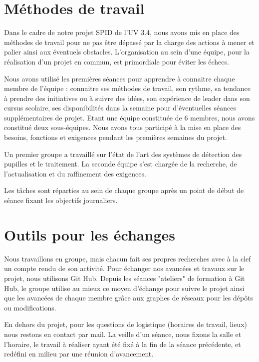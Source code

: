 
\chapter{Méthodes de travail}

Dans le cadre de notre projet SPID de l’UV 3.4, nous avons mis en place des méthodes de travail pour ne pas être dépassé par la charge des actions à mener et palier ainsi aux éventuels obstacles.  
L’organisation au sein d’une équipe, pour la réalisation d’un projet en commun, est primordiale pour éviter les échecs.

Nous avons utilisé les premières séances pour apprendre à connaitre chaque membre de l’équipe : connaitre ses méthodes de travail, son rythme, sa tendance à prendre des initiatives ou à suivre des idées, son expérience de leader dans son cursus scolaire, ses disponibilités dans la semaine pour d’éventuelles séances supplémentaires de projet. 
Etant une équipe constituée de 6 membres, nous avons constitué deux sous-équipes. Nous avons tous participé à la mise en place des besoins, fonctions et exigences pendant les premières semaines du projet. 

Un premier groupe a travaillé sur l'état de l'art des systèmes de détection des pupilles et le traitement. La seconde équipe s'est chargée de la recherche, de l'actualisation et du raffinement  des exigences. 

Les tâches sont réparties au sein de chaque groupe après un point de début de séance fixant les objectifs journaliers.

\chapter{Outils pour les échanges}

Nous travaillons en groupe, mais chacun fait ses propres recherches avec à la clef un compte rendu de son activité. Pour échanger nos avancées et travaux sur le projet, nous utilisons Git Hub. Depuis les séances "ateliers" de formation à Git Hub, le groupe utilise au mieux ce moyen d'échange pour suivre le projet ainsi que les avancées de chaque membre grâce aux graphes de réseaux pour les dépôts ou modifications. 

En dehors du projet, pour les questions de logistique (horaires de travail, lieux) nous restons en contact par mail. La veille d'un séance, nous fixons la salle et l'horaire, le travail à réaliser ayant été fixé à la fin de la séance précédente, et redéfini en milieu par une réunion d'avancement.  

